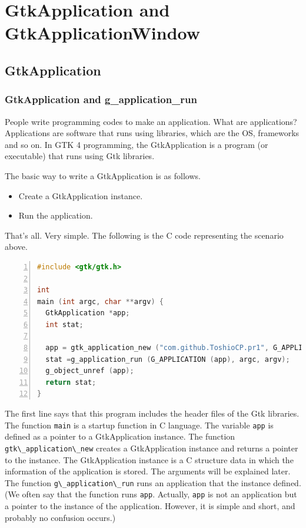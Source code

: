 \section{GtkApplication and
GtkApplicationWindow}\label{gtkapplication-and-gtkapplicationwindow}

\subsection{GtkApplication}\label{gtkapplication}

\subsubsection{GtkApplication and
g\_application\_run}\label{gtkapplication-and-g_application_run}

People write programming codes to make an application. What are
applications? Applications are software that runs using libraries, which
are the OS, frameworks and so on. In GTK 4 programming, the
GtkApplication is a program (or executable) that runs using Gtk
libraries.

The basic way to write a GtkApplication is as follows.

\begin{itemize}
\tightlist
\item
  Create a GtkApplication instance.
\item
  Run the application.
\end{itemize}

That's all. Very simple. The following is the C code representing the
scenario above.

\begin{lstlisting}[language=C, numbers=left]
#include <gtk/gtk.h>

int
main (int argc, char **argv) {
  GtkApplication *app;
  int stat;

  app = gtk_application_new ("com.github.ToshioCP.pr1", G_APPLICATION_DEFAULT_FLAGS);
  stat =g_application_run (G_APPLICATION (app), argc, argv);
  g_object_unref (app);
  return stat;
}
\end{lstlisting}

The first line says that this program includes the header files of the
Gtk libraries. The function \passthrough{\lstinline!main!} is a startup
function in C language. The variable \passthrough{\lstinline!app!} is
defined as a pointer to a GtkApplication instance. The function
\passthrough{\lstinline!gtk\_application\_new!} creates a GtkApplication
instance and returns a pointer to the instance. The GtkApplication
instance is a C structure data in which the information of the
application is stored. The arguments will be explained later. The
function \passthrough{\lstinline!g\_application\_run!} runs an
application that the instance defined. (We often say that the function
runs \passthrough{\lstinline!app!}. Actually,
\passthrough{\lstinline!app!} is not an application but a pointer to the
instance of the application. However, it is simple and short, and
probably no confusion occurs.)

